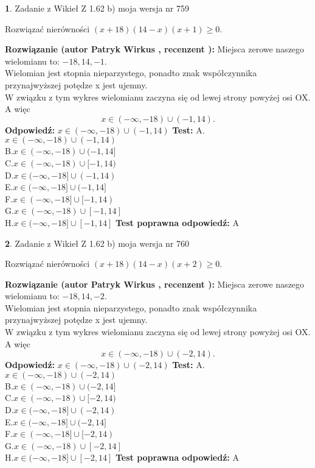 \documentclass[12pt, a4paper]{article}
\theoremstyle{definition} %
\newtheorem{zad}{}
\newcommand{\zadStart}[1]{\begin{zad}#1\newline}
\newcommand{\zadStop}{\end{zad}}
\newcommand{\rozwStart}[2]{\noindent \textbf{Rozwiązanie (autor #1 , recenzent #2): }\newline}
\newcommand{\rozwStop}{\newline}
\newcommand{\odpStart}{\noindent \textbf{Odpowiedź:}\newline}
\newcommand{\odpStop}{\newline}
\newcommand{\testStart}{\noindent \textbf{Test:}\newline}
\newcommand{\testStop}{\newline}
\newcommand{\kluczStart}{\noindent \textbf{Test poprawna odpowiedź:}\newline}
\newcommand{\kluczStop}{\newline}
\begin{document}
\zadStart{Zadanie z Wikieł Z 1.62 b) moja wersja nr 759}

Rozwiązać nierówności $(x+18)(14-x)(x+1)\ge0$.
\zadStop
\rozwStart{Patryk Wirkus}{}
Miejsca zerowe naszego wielomianu to: $-18, 14, -1$.\\
Wielomian jest stopnia nieparzystego, ponadto znak współczynnika przy\linebreak najwyższej potędze x jest ujemny.\\ W związku z tym wykres wielomianu zaczyna się od lewej strony powyżej osi OX. A więc $$x \in (-\infty,-18) \cup (-1,14).$$
\rozwStop
\odpStart
$x \in (-\infty,-18) \cup (-1,14)$
\odpStop
\testStart
A.$x \in (-\infty,-18) \cup (-1,14)$\\
B.$x \in (-\infty,-18) \cup (-1,14]$\\
C.$x \in (-\infty,-18) \cup [-1,14)$\\
D.$x \in (-\infty,-18] \cup (-1,14)$\\
E.$x \in (-\infty,-18] \cup (-1,14]$\\
F.$x \in (-\infty,-18] \cup [-1,14)$\\
G.$x \in (-\infty,-18) \cup [-1,14]$\\
H.$x \in (-\infty,-18] \cup [-1,14]$
\testStop
\kluczStart
A
\kluczStop



\zadStart{Zadanie z Wikieł Z 1.62 b) moja wersja nr 760}

Rozwiązać nierówności $(x+18)(14-x)(x+2)\ge0$.
\zadStop
\rozwStart{Patryk Wirkus}{}
Miejsca zerowe naszego wielomianu to: $-18, 14, -2$.\\
Wielomian jest stopnia nieparzystego, ponadto znak współczynnika przy\linebreak najwyższej potędze x jest ujemny.\\ W związku z tym wykres wielomianu zaczyna się od lewej strony powyżej osi OX. A więc $$x \in (-\infty,-18) \cup (-2,14).$$
\rozwStop
\odpStart
$x \in (-\infty,-18) \cup (-2,14)$
\odpStop
\testStart
A.$x \in (-\infty,-18) \cup (-2,14)$\\
B.$x \in (-\infty,-18) \cup (-2,14]$\\
C.$x \in (-\infty,-18) \cup [-2,14)$\\
D.$x \in (-\infty,-18] \cup (-2,14)$\\
E.$x \in (-\infty,-18] \cup (-2,14]$\\
F.$x \in (-\infty,-18] \cup [-2,14)$\\
G.$x \in (-\infty,-18) \cup [-2,14]$\\
H.$x \in (-\infty,-18] \cup [-2,14]$
\testStop
\kluczStart
A
\kluczStop
\end{document}
